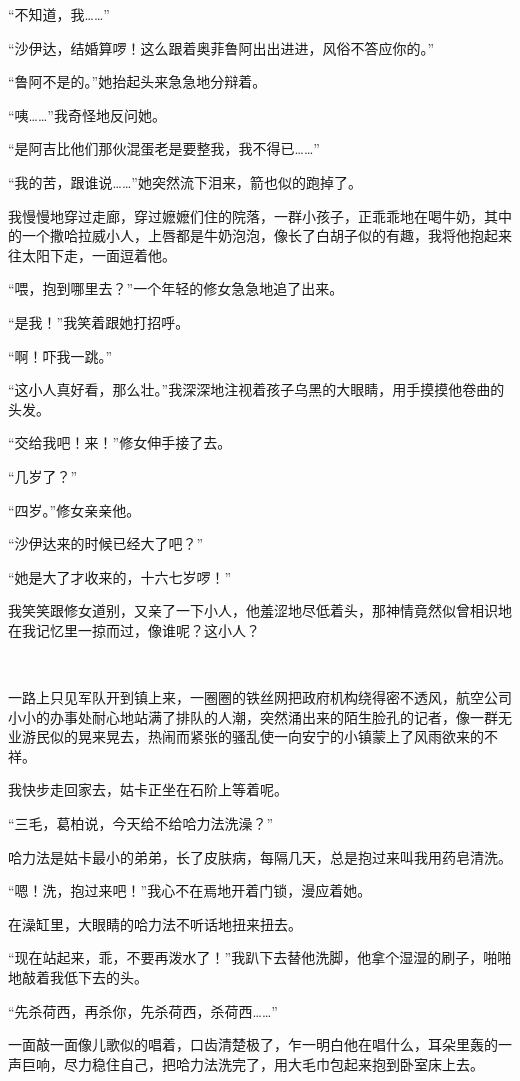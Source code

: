 \par “不知道，我……”
\par “沙伊达，结婚算啰！这么跟着奥菲鲁阿出出进进，风俗不答应你的。”
\par “鲁阿不是的。”她抬起头来急急地分辩着。
\par “咦……”我奇怪地反问她。
\par “是阿吉比他们那伙混蛋老是要整我，我不得已……”
\par “我的苦，跟谁说……”她突然流下泪来，箭也似的跑掉了。
\par 我慢慢地穿过走廊，穿过嬷嬷们住的院落，一群小孩子，正乖乖地在喝牛奶，其中的一个撒哈拉威小人，上唇都是牛奶泡泡，像长了白胡子似的有趣，我将他抱起来往太阳下走，一面逗着他。
\par “喂，抱到哪里去？”一个年轻的修女急急地追了出来。
\par “是我！”我笑着跟她打招呼。
\par “啊！吓我一跳。”
\par “这小人真好看，那么壮。”我深深地注视着孩子乌黑的大眼睛，用手摸摸他卷曲的头发。
\par “交给我吧！来！”修女伸手接了去。
\par “几岁了？”
\par “四岁。”修女亲亲他。
\par “沙伊达来的时候已经大了吧？”
\par “她是大了才收来的，十六七岁啰！”
\par 我笑笑跟修女道别，又亲了一下小人，他羞涩地尽低着头，那神情竟然似曾相识地在我记忆里一掠而过，像谁呢？这小人？
\par  
\par 一路上只见军队开到镇上来，一圈圈的铁丝网把政府机构绕得密不透风，航空公司小小的办事处耐心地站满了排队的人潮，突然涌出来的陌生脸孔的记者，像一群无业游民似的晃来晃去，热闹而紧张的骚乱使一向安宁的小镇蒙上了风雨欲来的不祥。
\par 我快步走回家去，姑卡正坐在石阶上等着呢。
\par “三毛，葛柏说，今天给不给哈力法洗澡？”
\par 哈力法是姑卡最小的弟弟，长了皮肤病，每隔几天，总是抱过来叫我用药皂清洗。
\par “嗯！洗，抱过来吧！”我心不在焉地开着门锁，漫应着她。
\par 在澡缸里，大眼睛的哈力法不听话地扭来扭去。
\par “现在站起来，乖，不要再泼水了！”我趴下去替他洗脚，他拿个湿湿的刷子，啪啪地敲着我低下去的头。
\par “先杀荷西，再杀你，先杀荷西，杀荷西……”
\par 一面敲一面像儿歌似的唱着，口齿清楚极了，乍一明白他在唱什么，耳朵里轰的一声巨响，尽力稳住自己，把哈力法洗完了，用大毛巾包起来抱到卧室床上去。
